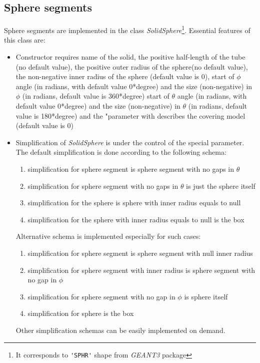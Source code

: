    \subsection{ Sphere  segments } 
Sphere  segments are implemented in the class 
{\it SolidSphere}\footnote{ It corresponds to \verb+'SPHR'+ shape from {\it GEANT3} package}. 
Essential features of this class are: 
\begin{itemize}
\item 
   Constructor requires name of the solid, the positive half-length of the tube (no default value), 
the positive outer radius of the sphere(no default value), 
the non-negative inner radius of the sphere (default value is 0),
start of $\phi$ angle (in radians, with default value 0*degree)
and the size (non-negative) in $\phi$ (in radians, default value is 360*degree) 
start of $\theta$ angle (in radians, with default value 0*degree)
and the size (non-negative) in $\theta$ (in radians, default value is 180*degree) 
and the "parameter with describes the covering model (default value is 0)
   \item 
Simplification of {\it SolidSphere } is under the control of the special parameter.
 The default simplification is done according to the following schema:
 \begin{enumerate}
  \item simplification for sphere segment is sphere segment  with no gaps in $\theta$
  \item simplification for sphere segment with no gaps in $\theta$ is just the sphere itself
  \item simplification for the sphere is sphere with inner radius equals to null 
  \item simplification for the sphere with inner radius equals to null is the box 
 \end{enumerate}
Alternative schema is implemented especially for such cases:
 \begin{enumerate}
  \item simplification for sphere segment is sphere segment with null inner radius 
  \item simplification for sphere segment with  inner radius is sphere segment with no gap in $\phi$    
  \item simplification for sphere segment with no gap in $\phi$ is sphere itself 
  \item simplification for sphere is the box
 \end{enumerate}
Other simplification schemas can be easily implemented on demand. 
\end{itemize} 
 

